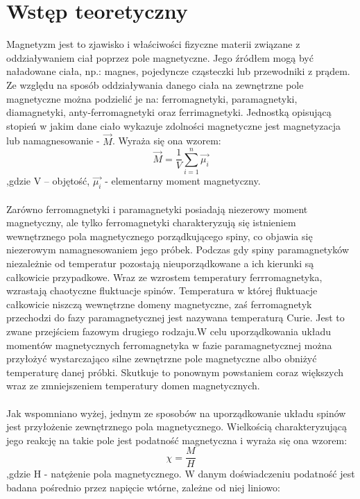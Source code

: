 \documentclass[a4paper,10pt]{article}
\begin{document}
\section{Wstęp teoretyczny}
Magnetyzm jest to zjawisko i właściwości fizyczne materii związane z oddziaływaniem ciał poprzez pole magnetyczne. Jego źródłem mogą być naładowane ciała, np.:
magnes, pojedyncze cząsteczki lub przewodniki z prądem. Ze względu na sposób oddziaływania danego ciała na zewnętrzne pole magnetyczne można podzielić je na:
ferromagnetyki, paramagnetyki, diamagnetyki, anty-ferromagnetyki oraz ferrimagnetyki. Jednostką opisującą stopień w jakim dane ciało wykazuje zdolności magnetyczne
jest magnetyzacja lub namagnesowanie - $\vec{M}$. Wyraża się ona wzorem:
\begin{equation}
\vec{M} =\frac{1}{V} \sum_{i=1}^n \vec{\mu_i}
\end{equation}
,gdzie V – objętość, $\vec{\mu_i}$ - elementarny moment magnetyczny.
\\%
\\Zarówno ferromagnetyki i paramagnetyki posiadają niezerowy moment magnetyczny, ale  tylko ferromagnetyki charakteryzują się istnieniem wewnętrznego pola
magnetycznego porządkującego spiny, co objawia się niezerowym namagnesowaniem jego próbek. Podczas gdy spiny paramagnetyków niezależnie od temperatur pozostają
nieuporządkowane a ich kierunki są całkowicie przypadkowe. Wraz ze wzrostem temperatury ferrromagnetyka, wzrastają chaotyczne fluktuacje spinów. Temperatura w której fluktuacje całkowicie niszczą wewnętrzne domeny magnetyczne, zaś ferromagnetyk przechodzi do fazy paramagnetycznej jest nazywana temperaturą Curie. Jest to zwane przejściem fazowym drugiego rodzaju.W celu uporządkowania układu momentów magnetycznych ferromagnetyka w fazie paramagnetycznej można
przyłożyć wystarczająco silne zewnętrzne pole magnetyczne albo obniżyć temperaturę danej próbki. Skutkuje to ponownym powstaniem coraz większych wraz ze zmniejszeniem temperatury domen magnetycznych.
\\
\\Jak wspomniano wyżej, jednym ze sposobów na uporządkowanie układu spinów jest przyłożenie zewnętrznego pola magnetycznego. Wielkością charakteryzującą jego reakcję
na takie pole jest podatność magnetyczna i wyraża się ona wzorem:
\begin{equation}
\chi = \frac{M}{H}
\end{equation}
,gdzie H - natężenie pola magnetycznego. W danym doświadczeniu podatność jest badana pośrednio przez napięcie wtórne, zależne od niej liniowo:
\end{document}

